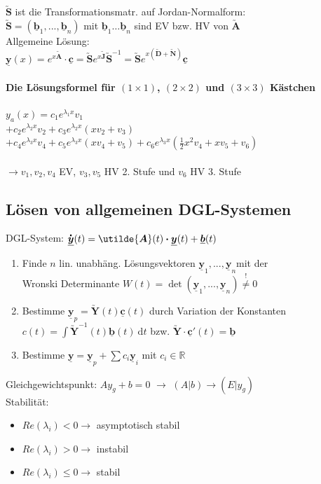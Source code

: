 \documentclass[6pt,a4paper]{scrartcl}
\newcommand{\ma}[1]{\ensuremath{\utilde{\boldsymbol {#1}}}}						%
\newcommand{\bdot}{\ensuremath{\boldsymbol \cdot}} 								%
\renewcommand{\vec}[1]{\ensuremath{\underline{\boldsymbol {#1}}}}
\renewcommand*{\dot}[1]{\accentset{\mbox{\textrm{\large\bfseries .}} }{#1}}
\newcommand{\ra}[0]{\ensuremath{\rightarrow}} 									%
\newcommand{\diff}{\ensuremath{\ \mathrm d}}									%
\newcommand{\R}{\ensuremath{\mathbb R}}
\begin{document}
\begin{multicols}{4}
	$\ma S$ ist die Transformationsmatr. auf Jordan-Normalform: \\
	$\ma S = (\vec b_1, ..., \vec b_n)$ mit $\vec b_1 \ldots \vec b_n$ sind EV bzw. HV von $\ma A$
	\\
	
	
	Allgemeine Lösung: \\
	$\boxed{\vec y(x) = e^{x \ma A} \cdot \vec c = \ma S e^{x \ma J} \ma S^{-1} = \ma S e^{x(\ma D + \ma N)} \vec c}$
	
	\paragraph{Die Lösungsformel für $(1 \times 1)$, $(2 \times 2)$ und $(3 \times 3)$ Kästchen}
	
	$y_a (x) = c_1 e^{\lambda_1 x} v_1$ \\
	$+ c_2 e^{\lambda_2 x} v_2 + c_3 e^{\lambda_2 x}(xv_2 + v_3)$ \\
	$+ c_4 e^{\lambda_3 x} v_4 + c_5 e^{\lambda_3 x}(xv_4 + v_5) + c_6 e^{\lambda_3 x} (\frac{1}{2} x^2 v_4 + xv_5 + v_6)$ \\
	\\ \ra  $v_1, v_2, v_4$ EV, $v_3, v_5$ HV 2. Stufe und $v_6$ HV 3. Stufe
	
	\subsection{Lösen von allgemeinen DGL-Systemen}
	DGL-System: $\dot {\vec y}(t) = \ma A(t) \bdot \vec y(t) + \vec b(t)$
	\begin{enumerate}
		\item Finde $n$ lin. unabhäng. Lösungsvektoren $\vec y_1,...,\vec y_n$mit der\\
			Wronski Determinante $W(t) = \det(\vec y_1,...,\vec y_n) \stackrel{!}{\ne} 0$
		\item Bestimme $\vec y_p = \ma Y(t) \vec c(t)$ durch Variation der Konstanten\\
			$c(t) = \int \ma Y^{-1}(t) \vec b(t) \diff t$ bzw. $\ma Y \cdot \vec c'(t) = \vec b$
		\item Bestimme $\vec y = \vec y_p + \sum c_i \vec y_i$ mit $c_i \in \R$
	\end{enumerate}
	Gleichgewichtspunkt: $A y_g + b = 0$ $\ra$ $(A | b) \ra (E | y_g)$ \\
	Stabilität:
	\begin{itemize}\itemsep-1pt
	\item $Re(\lambda_i) < 0 \ra$ asymptotisch stabil 
	\item $Re(\lambda_i) > 0 \ra$ instabil
	\item $Re(\lambda_i) \le 0 \ra$ stabil
	\end{itemize}




\end{multicols}
\end{document}
